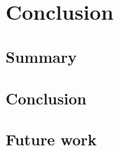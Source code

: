 
\chapter{Conclusion}\label{chap:conclusion}


\section{Summary} \label{summary}


\section{Conclusion} \label{conclusion}


\section{Future work} \label{futurework}
